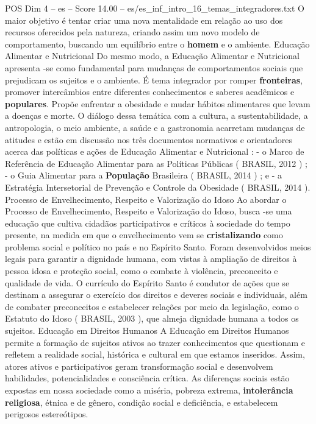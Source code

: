 \begin{textsample}{POS Dim 4 – es – Score 14.00 – es/es\_inf\_intro\_16\_temas\_integradores.txt}
O maior objetivo é tentar criar uma nova mentalidade em relação ao uso dos recursos oferecidos pela natureza, criando assim um novo modelo de comportamento, buscando um equilíbrio entre o \textbf{homem} e o ambiente.
Educação Alimentar e Nutricional Do mesmo modo, a Educação Alimentar e Nutricional apresenta -se como fundamental para mudanças de comportamentos sociais que prejudicam os sujeitos e o ambiente.
É tema integrador por romper \textbf{fronteiras}, promover intercâmbios entre diferentes conhecimentos e saberes acadêmicos e \textbf{populares}.
Propõe enfrentar a obesidade e mudar hábitos alimentares que levam a doenças e morte.
O diálogo dessa temática com a cultura, a sustentabilidade, a antropologia, o meio ambiente, a saúde e a gastronomia acarretam mudanças de atitudes e estão em discussão nos três documentos normativos e orientadores acerca das políticas e ações de Educação Alimentar e Nutricional : - o Marco de Referência de Educação Alimentar para as Políticas Públicas ( BRASIL, 2012 ) ; - o Guia Alimentar para a \textbf{População} Brasileira ( BRASIL, 2014 ) ; e - a Estratégia Intersetorial de Prevenção e Controle da Obesidade ( BRASIL, 2014 ).
Processo de Envelhecimento, Respeito e Valorização do Idoso Ao abordar o Processo de Envelhecimento, Respeito e Valorização do Idoso, busca -se uma educação que cultiva cidadãos participativos e críticos à sociedade do tempo presente, na medida em que o envelhecimento vem se \textbf{cristalizando} como problema social e político no país e no Espírito Santo.
Foram desenvolvidos meios legais para garantir a dignidade humana, com vistas à ampliação de direitos à pessoa idosa e proteção social, como o combate à violência, preconceito e qualidade de vida.
O currículo do Espírito Santo é condutor de ações que se destinam a assegurar o exercício dos direitos e deveres sociais e individuais, além de combater preconceitos e estabelecer relações por meio da legislação, como o Estatuto do Idoso ( BRASIL, 2003 ), que almeja dignidade humana a todos os sujeitos.
Educação em Direitos Humanos A Educação em Direitos Humanos permite a formação de sujeitos ativos ao trazer conhecimentos que questionam e refletem a realidade social, histórica e cultural em que estamos inseridos.
Assim, atores ativos e participativos geram transformação social e desenvolvem habilidades, potencialidades e consciência crítica.
As diferenças sociais estão expostas em nossa sociedade como a miséria, pobreza extrema, \textbf{intolerância} \textbf{religiosa}, étnica e de gênero, condição social e deficiência, e estabelecem perigosos estereótipos.

\end{textsample}
